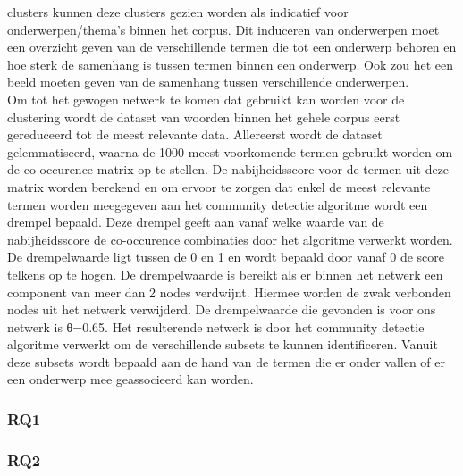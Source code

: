 clusters kunnen deze clusters gezien worden als indicatief voor onderwerpen/thema's binnen het corpus. Dit induceren van onderwerpen moet een overzicht geven van de verschillende termen die tot  een onderwerp behoren en hoe sterk de samenhang is tussen termen binnen een onderwerp. Ook zou het een beeld moeten geven van de samenhang tussen verschillende onderwerpen. 
\\
Om tot het gewogen netwerk te komen dat gebruikt kan worden voor de clustering wordt de dataset van woorden binnen het gehele corpus eerst gereduceerd tot de meest relevante data. Allereerst wordt de dataset gelemmatiseerd, waarna de 1000 meest voorkomende termen gebruikt worden om de co-occurence matrix op te stellen. De nabijheidsscore voor de termen uit deze matrix worden berekend en om ervoor te zorgen dat enkel de meest relevante termen worden meegegeven aan het community detectie algoritme wordt een drempel bepaald. Deze drempel geeft aan vanaf welke waarde van de nabijheidsscore de co-occurence combinaties door het algoritme verwerkt worden. De drempelwaarde ligt tussen de 0 en 1 en wordt bepaald door vanaf 0 de score telkens op te hogen. De drempelwaarde is bereikt als er binnen het netwerk een component van meer dan 2 nodes verdwijnt. Hiermee worden de zwak verbonden nodes uit het netwerk verwijderd. De drempelwaarde die gevonden is voor ons netwerk is θ=0.65. Het resulterende netwerk is door het community detectie algoritme verwerkt om de verschillende subsets te kunnen identificeren. Vanuit deze subsets wordt bepaald aan de hand van de termen die er onder vallen of er een onderwerp mee geassocieerd kan worden.


\subsubsection{RQ1}

\subsubsection{RQ2}